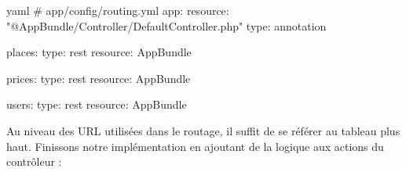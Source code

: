\documentclass[big]{zmdocument}
\begin{document}
\begin{CodeBlock}{yaml}
# app/config/routing.yml
app:
    resource: "@AppBundle/Controller/DefaultController.php"
    type:     annotation

places:
    type:     rest
    resource: AppBundle\Controller\PlaceController

prices:
    type:     rest
    resource: AppBundle\Controller\Place\PriceController

users:
    type:     rest
    resource: AppBundle\Controller\UserController
\end{CodeBlock}



Au niveau des URL utilisées dans le routage, il suffit de se référer au tableau plus haut. 
Finissons notre implémentation en ajoutant de la logique aux actions du contrôleur :
\end{document}
